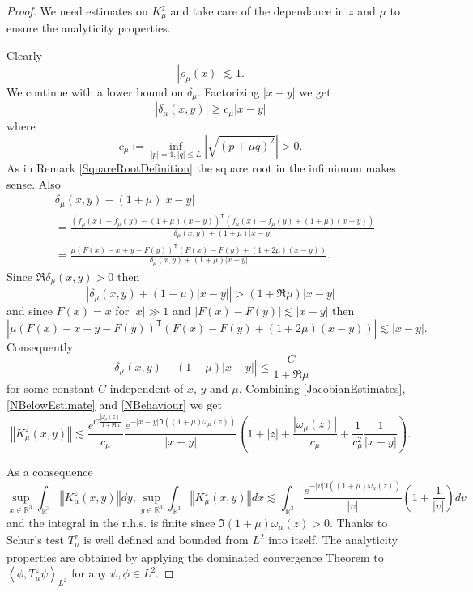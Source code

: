 \documentclass[a4paper, 12pt]{amsart}
\numberwithin{equation}{section}
\newcommand{\R}{\mathbb{R}} %
\newcommand{\lp}{\left(} %
\newcommand{\rp}{\right)} %
\newcommand{\la}{\left\langle} %
\newcommand{\ra}{\right\rangle} %
\newcommand{\lv}{\left\vert} %
\newcommand{\rv}{\right\vert} %
\newcommand{\lV}{\left\Vert} %
\newcommand{\rV}{\right\Vert} %
\newcommand{\Tsf}{\mathsf{T}} %
\begin{document}
\begin{proof}
    We need estimates on $K_\mu^z$ and take care of the dependance in $z$ and $\mu$ to ensure the analyticity properties.

    Clearly
    \begin{equation}\label{JacobianEstimates}
        \lv \rho_\mu(x)\rv\lesssim1.
    \end{equation}
    We continue with a lower bound on $\delta_\mu$. Factorizing $\lv x-y\rv$ we get
    \begin{equation}\label{NBelowEstimate}
        \lv \delta_\mu(x,y)\rv\geq c_\mu\lv x-y\rv
    \end{equation}
    where 
    \[c_\mu:=\inf_{\lv p\rv=1,\lv q\rv\leq L}\lv\sqrt{\lp p+\mu q\rp^2}\rv>0.\]
    As in Remark \ref{SquareRootDefinition} the square root in the infimimum makes sense. Also
    \begin{align*}
        &\delta_\mu(x,y)-(1+\mu)\lv x-y\rv\\
        &=\frac{
        (f_\mu(x)-f_\mu(y)-(1+\mu)(x-y))^\Tsf(f_\mu(x)-f_\mu(y)+(1+\mu)(x-y))}{\delta_\mu(x,y)+(1+\mu)\lv x-y\rv}\\
        &=\frac{\mu
        (F(x)-x+y-F(y))^\Tsf(F(x)-F(y)+(1+2\mu)(x-y))}{\delta_\mu(x,y)+(1+\mu)\lv x-y\rv}.
    \end{align*}
    Since $\Re\delta_\mu(x,y)>0$ then
    \[\lv \delta_\mu(x,y)+(1+\mu)\lv x-y\rv\rv>(1+\Re\mu)\lv x-y\rv\]
    and since $F(x)=x$ for $\lv x\rv\gg1$ and $\lv F(x)-F(y)\rv\lesssim\lv x-y\rv$ then
    \[\lv\mu(F(x)-x+y-F(y))^\Tsf(F(x)-F(y)+(1+2\mu)(x-y))\rv\lesssim\lv x-y\rv.\]
    Consequently
    \begin{equation}\label{NBehaviour}
        \lv \delta_\mu(x,y)-(1+\mu)\lv x-y\rv\rv\leq\frac{C}{1+\Re\mu}
    \end{equation}
    for some constant $C$ independent of $ x$, $y$ and $\mu$. Combining  \eqref{JacobianEstimates}, \eqref{NBelowEstimate} and \eqref{NBehaviour} we get
    \begin{equation}
        \lV K_\mu^z(x,y)\rV\lesssim\frac{e^{C\frac{\lv\omega_\mu(z)\rv}{1+\Re\mu}}}{c_\mu}\frac{e^{-\lv x-y\rv\Im\lp(1+\mu)\omega_\mu(z)\rp}}{\lv x-y\rv}\lp1+\lv z\rv+\frac{\lv\omega_\mu(z)\rv}{c_\mu}+\frac{1}{c_\mu^2}\frac{1}{\lv x-y\rv}\rp.
    \end{equation}
    
    As a consequence
    \[\sup_{ x\in\R^3}\int_{\R^3}\lV K_\mu^z(x,y)\rV dy, \sup_{y\in\R^3}\int_{\R^3}\lV K_\mu^z(x,y)\rV d x\lesssim\int_{\R^3}\frac{e^{-\lv v\rv\Im\lp(1+\mu)\omega_\mu(z)\rp}}{\lv v\rv}\lp1+\frac{1}{\lv v\rv}\rp dv\]
    and the integral in the r.h.s. is finite since $\Im(1+\mu)\omega_\mu(z)>0$. 
    Thanks to Schur's test $T_\mu^z$ is well defined and bounded from $ L^2$ into itself. The analyticity properties are obtained by applying the dominated convergence Theorem to $\la\phi,T_\mu^z\psi\ra_{L^2}$ for any $\psi,\phi\in L^2$.
\end{proof}

\printbibliography
\end{document}
